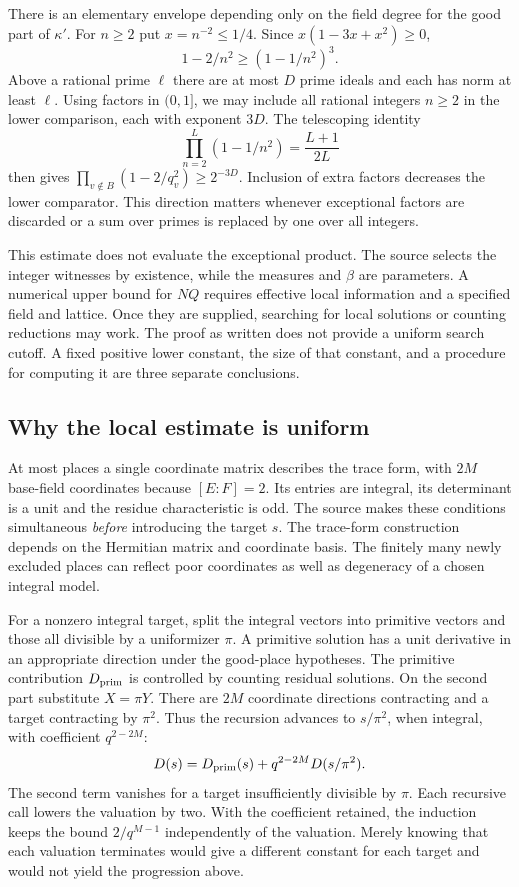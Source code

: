 \documentclass[12pt,letterpaper]{article}
\begin{document}
There is an elementary envelope depending only on the field degree for the good part of \(\kappa'\). For \(n\ge2\) put \(x=n^{-2}\le1/4\). Since \(x(1-3x+x^2)\ge0\),
\[
   1-2/n^2\ge(1-1/n^2)^3.
\]
Above a rational prime \(\ell\) there are at most \(D\) prime ideals and each has norm at least \(\ell\). Using factors in \((0,1]\), we may include all rational integers \(n\ge2\) in the lower comparison, each with exponent \(3D\). The telescoping identity
\[
 \prod_{n=2}^{L}(1-1/n^2)=\frac{L+1}{2L}
\]
then gives \(\prod_{v\notin B}(1-2/q_v^2)\ge2^{-3D}\). Inclusion of extra factors decreases the lower comparator. This direction matters whenever exceptional factors are discarded or a sum over primes is replaced by one over all integers.

This estimate does not evaluate the exceptional product. The source selects the integer witnesses by existence, while the measures and \(\beta\) are parameters. A numerical upper bound for \(NQ\) requires effective local information and a specified field and lattice. Once they are supplied, searching for local solutions or counting reductions may work. The proof as written does not provide a uniform search cutoff. A fixed positive lower constant, the size of that constant, and a procedure for computing it are three separate conclusions.

\clearpage\subsection{Why the local estimate is uniform}
At most places a single coordinate matrix describes the trace form, with \(2M\) base-field coordinates because \([E:F]=2\). Its entries are integral, its determinant is a unit and the residue characteristic is odd. The source makes these conditions simultaneous \emph{before} introducing the target \(s\). The trace-form construction depends on the Hermitian matrix and coordinate basis. The finitely many newly excluded places can reflect poor coordinates as well as degeneracy of a chosen integral model.

For a nonzero integral target, split the integral vectors into primitive vectors and those all divisible by a uniformizer \(\pi\). A primitive solution has a unit derivative in an appropriate direction under the good-place hypotheses. The primitive contribution \(D_{\rm prim}\) is controlled by counting residual solutions. On the second part substitute \(X=\pi Y\). There are \(2M\) coordinate directions contracting and a target contracting by \(\pi^2\). Thus the recursion advances to \(s/\pi^2\), when integral, with coefficient \(q^{2-2M}\):
\[
              D(s)=D_{\rm prim}(s)+q^{2-2M}D(s/\pi^2).
\]
The second term vanishes for a target insufficiently divisible by \(\pi\). Each recursive call lowers the valuation by two. With the coefficient retained, the induction keeps the bound \(2/q^{M-1}\) independently of the valuation. Merely knowing that each valuation terminates would give a different constant for each target and would not yield the progression above.
\end{document}
